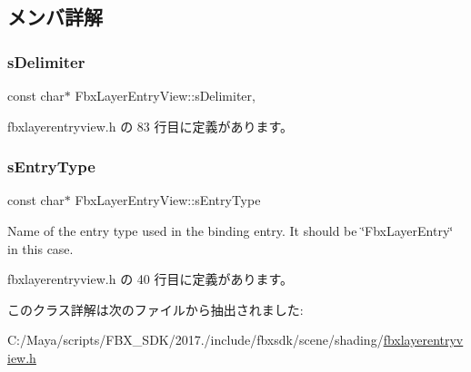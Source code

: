 \subsection{メンバ詳解}
\mbox{\label{class_fbx_layer_entry_view_a2143b40ee433ec7138342298b0cf76f3}} 
\subsubsection{\texorpdfstring{s\+Delimiter}{sDelimiter}}
{\footnotesize\ttfamily const char$\ast$ Fbx\+Layer\+Entry\+View\+::s\+Delimiter\hspace{0.3cm}{\ttfamily [static]}, {\ttfamily [protected]}}



 fbxlayerentryview.\+h の 83 行目に定義があります。

\mbox{\label{class_fbx_layer_entry_view_aa8222d7ad3155f8e83652e030ab22e91}} 
\subsubsection{\texorpdfstring{s\+Entry\+Type}{sEntryType}}
{\footnotesize\ttfamily const char$\ast$ Fbx\+Layer\+Entry\+View\+::s\+Entry\+Type\hspace{0.3cm}{\ttfamily [static]}}

Name of the entry type used in the binding entry. It should be \char`\"{}\+Fbx\+Layer\+Entry\char`\"{} in this case. 

 fbxlayerentryview.\+h の 40 行目に定義があります。



このクラス詳解は次のファイルから抽出されました\+:\begin{DoxyCompactItemize}
\item 
C\+:/\+Maya/scripts/\+F\+B\+X\+\_\+\+S\+D\+K/2017./include/fbxsdk/scene/shading/\hyperlink{fbxlayerentryview_8h}{fbxlayerentryview.\+h}\end{DoxyCompactItemize}
